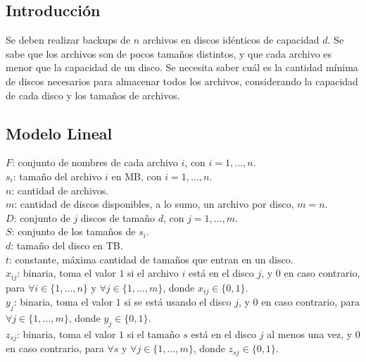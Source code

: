\documentclass[11pt, a4paper, pdftex]{article}
\begin{document}
\subsection{Introducción}

Se deben realizar backups de $n$ archivos en discos idénticos de
capacidad $d$.  Se sabe que los archivos son de pocos tamaños distintos,
y que cada archivo es menor que la capacidad de un disco. Se necesita
saber cuál es la cantidad mínima de discos necesarios para almacenar
todos los archivos, considerando la capacidad de cada disco y los
tamaños de archivos.

\subsection{Modelo Lineal}
$F$: conjunto de nombres de cada archivo $i$, con $i = 1, \ldots, n$. \\

$s_{i}$: tamaño del archivo $i$ en MB, con $i = 1, \ldots, n$. \\

$n$: cantidad de archivos. \\

$m$: cantidad de discos disponibles, a lo sumo, un archivo por disco, $m = n$. \\

$D$: conjunto de $j$ discos de tamaño $d$, con $j = 1, \ldots, m$. \\

$S$: conjunto de los tamaños de $s_{i}$. \\ 

$d$: tamaño del disco en TB. \\ 

$t$: constante, máxima cantidad de tamaños que entran en un disco. \\ 

$x_{ij}$: binaria, toma el valor $1$ si el archivo $i$ está en el disco $j$, y $0$ en caso contrario, para $\forall i \in \{1, \ldots, n\}$ y $\forall j \in \{1, \ldots, m\}$, donde $x_{ij} \in \{0, 1\}$. \\


$y_{j}$: binaria, toma el valor $1$ si se está usando el disco $j$, y $0$ en caso contrario, para $\forall j \in \{1, \ldots, m\}$, donde $y_{j} \in \{0, 1\}$. \\

$z_{sj}$: binaria, toma el valor $1$ si el tamaño $s$ está en el disco $j$ al menos una vez, y $0$ en caso contrario, para $\forall s$ y $\forall j \in \{1, \ldots, m\}$, donde $z_{sj} \in \{0, 1\}$. \\
\end{document}
